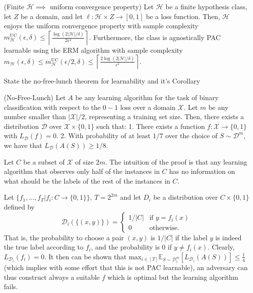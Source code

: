 \documentclass[11pt,a4paper,twoside]{article}
\begin{document}
(Finite \(\mathcal{H} \implies \) uniform convergence property)
Let \(\mathcal{H}\) be a finite hypothesis class, let \(Z\) be a domain, and let \(\ell : \mathcal{H} \times Z \to [0,1]\) be a loss function. 
Then, \(\mathcal{H}\) enjoys the uniform convergence property with sample complexity
\(
m_{\mathcal{H}}^{\text{UC}}(ϵ, δ) \leq \left\lceil \frac{\log(2|\mathcal{H}|/δ)}{2ϵ^2} \right\rceil.
\)
Furthermore, the class is agnostically PAC learnable using the ERM algorithm with sample complexity
\(
m_{\mathcal{H}}(ϵ, δ) \leq m_{\mathcal{H}}^{\text{UC}}(ϵ/2, δ) \leq \left\lceil \frac{2\log(2|\mathcal{H}|/δ)}{ϵ^2} \right\rceil.
\)

State the no-free-lunch theorem for learnability and it's Corollary

(No-Free-Lunch) 
Let \(A\) be any learning algorithm for the task of binary classification with respect to the \(0 - 1\) loss over a domain \(\mathcal{X}\). 
Let \(m\) be any number smaller than \(|\mathcal{X}|/2\), representing a training set size. 
Then, there exists a distribution \(\mathcal{D}\) over \(\mathcal{X} \times \{0,1\}\) such that:
1. There exists a function \(f : \mathcal{X} \to \{0,1\}\) with \(L_{\mathcal{D}}(f) = 0\).
2. With probability of at least \(1/7\) over the choice of \(S \sim \mathcal{D}^m\), we have that \(L_{\mathcal{D}}(A(S)) \geq 1/8\).

Let \( C \) be a subset of \( \mathcal{X} \) of size \( 2m \). 
The intuition of the proof is that any learning algorithm that observes 
only half of the instances in \( C \) has no information on what should be the labels of the rest of the instances in \( C \).

Let \( \{f_1, \dots, f_T | f_i : C \to \{0, 1\} \},\ T = 2^{2m} \) and let \( D_i \) be a distribution over
\(C \times \{0,1\}\) defined by
\[
\mathcal{D}_i(\{(x,y)\}) = 
\begin{cases} 
1/|C| & \text{if } y = f_i(x) \\
0 & \text{otherwise}.
\end{cases}
\]
That is, the probability to choose a pair \((x, y)\) is \(1/|C|\) if the label \(y\) is indeed the true label according to \(f_i\), 
and the probability is \(0\) if \(y \neq f_i(x)\). Clearly, \(L_{\mathcal{D}_i}(f_i) = 0\).
It then can be shown that \( \text{max}_{i \in [T]} \mathbb{E}_{S \sim \mathcal{D}^m_i}[L_{\mathcal{D}_i}(A(S))] \leq \frac{1}{4}\)
(which implies with some effort that this is not PAC learnable), an adversary can thus construct always a suitable \( f \) which is optimal
but the learning algorithm fails.
\end{document}
